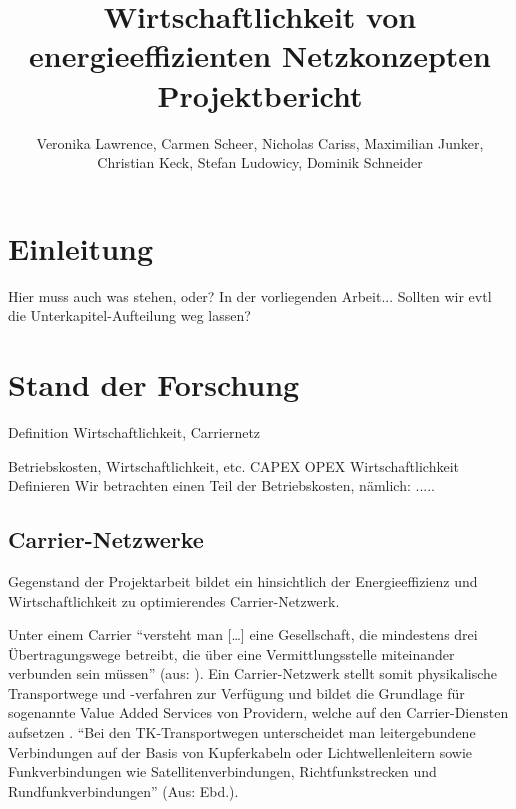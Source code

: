 \documentclass[12pt,titlepage]{article}
\newcommand{\firstpages}{

     \newpage
     \tableofcontents{}
     \addtocontents{toc}{~\hfill\textbf{Seite}\par}

     \newpage
     \listoffigures

     \newpage
     \listoftables
     \newpage
}
\begin{document}
\title{\huge{Wirtschaftlichkeit von energieeffizienten Netzkonzepten} \\ \large{Projektbericht}} 
\author{Veronika Lawrence, Carmen Scheer, Nicholas Cariss, Maximilian Junker,\\ Christian Keck, Stefan Ludowicy, Dominik Schneider} 
\maketitle
\firstpages

\section{Einleitung}
Hier muss auch was stehen, oder? 
In der vorliegenden Arbeit...
Sollten wir evtl die Unterkapitel-Aufteilung weg lassen?







\section{Stand der Forschung}
Definition Wirtschaftlichkeit, Carriernetz

Betriebskosten, Wirtschaftlichkeit, etc.
CAPEX OPEX
Wirtschaftlichkeit
Definieren
Wir betrachten einen Teil der Betriebskosten, nämlich: .....

\subsection{Carrier-Netzwerke}

%

Gegenstand der Projektarbeit bildet ein hinsichtlich der Energieeffizienz und Wirtschaftlichkeit zu optimierendes Carrier-Netzwerk.

Unter einem Carrier "`versteht man […] eine Gesellschaft, die mindestens drei Übertra\-gungs\-wege betreibt, die über eine Vermittlungsstelle miteinander verbunden sein müssen"' (aus: \cite{carrier}). Ein Carrier-Netzwerk stellt somit physikalische Transportwege und -verfahren zur Verfügung und bildet die Grundlage für sogenannte Value Added Services von Providern, welche auf den Carrier-Diensten aufsetzen \cite{fassnacht}. "`Bei den TK-Transportwegen unterscheidet man leitergebundene Verbindungen auf der Basis von Kupferkabeln oder Lichtwellenleitern sowie Funkverbindungen wie Satellitenverbindungen, Richtfunkstrecken und Rundfunkverbindungen"' (Aus: Ebd.).%
\end{document}
